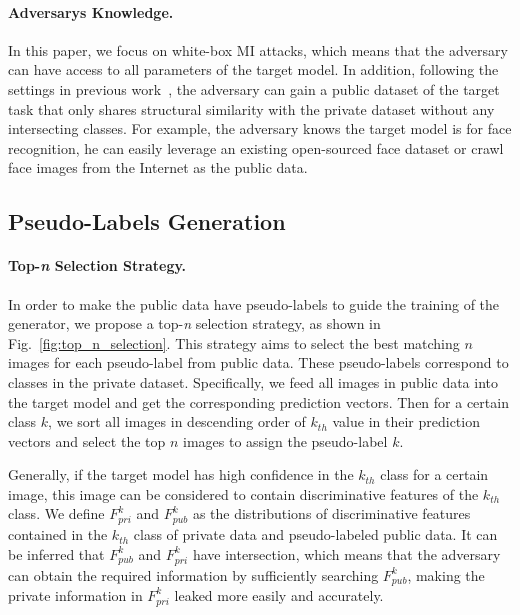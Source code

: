 \documentclass[letterpaper]{article} %
\newcommand{\Fref}[1]{Fig.~\ref{#1}}
\begin{document}
\paragraph{Adversarys Knowledge.}
In this paper, we focus on white-box MI attacks, which means that the adversary can have access to all parameters of the target model. In addition, following the settings in previous work~\cite{zhang2020secret, chen2021knowledge, kahla2022label}, the adversary can gain a public dataset of the target task that only shares structural similarity with the private dataset without any intersecting classes. For example, the adversary knows the target model is for face recognition, he can easily leverage an existing open-sourced face dataset or crawl face images from the Internet as the public data.
	
\subsection{Pseudo-Labels Generation} 
	
\paragraph{Top-\emph{n} Selection Strategy.}
In order to make the public data have pseudo-labels to guide the training of the generator, we propose a top-\emph{n} selection strategy, as shown in \Fref{fig:top_n_selection}. This strategy aims to select the best matching $n$ images for each pseudo-label from public data. These pseudo-labels correspond to classes in the private dataset. Specifically, we feed all images in public data into the target model and get the corresponding prediction vectors. Then for a certain class $k$, we sort all images in descending order of $k_{th}$ value in their prediction vectors and select the top $n$ images to assign the pseudo-label $k$.

	
Generally, if the target model has high confidence in the $k_{th}$ class for a certain image, this image can be considered to contain discriminative features of the $k_{th}$ class. We define $F^{k}_{pri}$ and $F^{k}_{pub}$ as the distributions of discriminative features contained in the $k_{th}$ class of private data and pseudo-labeled public data. It can be inferred that $F^{k}_{pub}$ and $F^{k}_{pri}$ have intersection, which means that the adversary can obtain the required information by sufficiently searching $F^{k}_{pub}$, making the private information in $F^{k}_{pri}$ leaked more easily and accurately.
\end{document}
